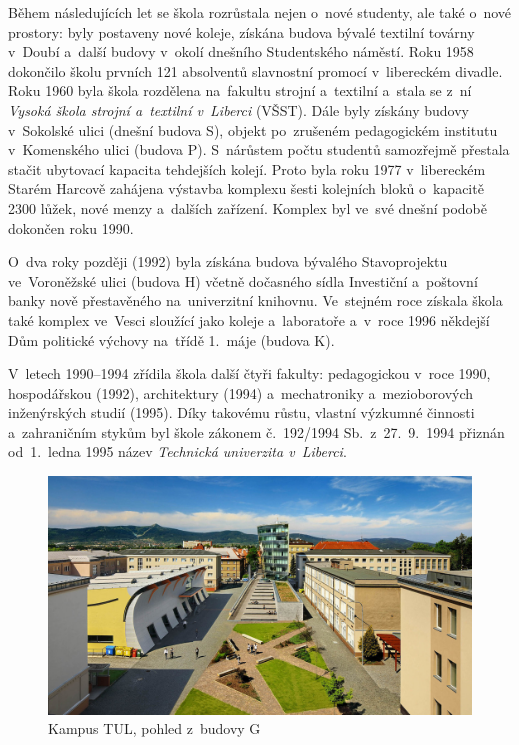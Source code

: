 \documentclass[a4paper,12pt,fonts]{./tulpackage/tularticle}
\begin{document}
\clearpage

Během následujících let se škola rozrůstala nejen o~nové studenty, ale také o~nové prostory: byly postaveny nové koleje, získána budova bývalé textilní továrny v~Doubí a~další budovy v~okolí dnešního Studentského náměstí. Roku 1958 dokončilo školu prvních 121 absolventů slavnostní promocí v~libereckém divadle. Roku 1960 byla škola rozdělena na~fakultu strojní a~textilní a~stala se z~ní \textit{Vysoká škola strojní a~textilní v~Liberci} (VŠST). Dále byly získány budovy v~Sokolské ulici (dnešní budova S), objekt po~zrušeném pedagogickém institutu v~Komenského ulici (budova P). S~nárůstem počtu studentů samozřejmě přestala stačit ubytovací kapacita tehdejších kolejí. Proto byla roku 1977 v~libereckém Starém Harcově zahájena výstavba komplexu šesti kolejních bloků o~kapacitě 2300 lůžek, nové menzy a~dalších zařízení. Komplex byl ve~své dnešní podobě dokončen roku 1990.~\cite{niznansky}

O~dva roky později (1992) byla získána budova bývalého Stavoprojektu ve~Voroněžské ulici (budova H) včetně dočasného sídla Investiční a~poštovní banky nově přestavěného na~univerzitní knihovnu. Ve~stejném roce získala škola také komplex ve~Vesci sloužící jako koleje a~laboratoře a~v~roce 1996 někdejší Dům politické výchovy na~třídě 1.~máje (budova K).~\cite{golka}

V~letech 1990--1994 zřídila škola další čtyři fakulty: pedagogickou v~roce 1990, hospodářskou (1992), architektury (1994) a~mechatroniky a~mezioborových inženýrských studií (1995). Díky takovému růstu, vlastní výzkumné činnosti a~zahraničním stykům byl škole zákonem č.~192/1994 Sb.\ z~27.~9.~1994 přiznán od~1.~ledna 1995 název \textit{Technická univerzita v~Liberci}.~\cite{zakon192}

\vspace{1.2em}
\begin{figure}[H]
  \centering
  \includegraphics[width=0.6\linewidth]{pictures/kampus_tul.jpg}
  \caption{Kampus TUL, pohled z~budovy G}
  \label{fig:kampus-tul}
\end{figure}
\end{document}
